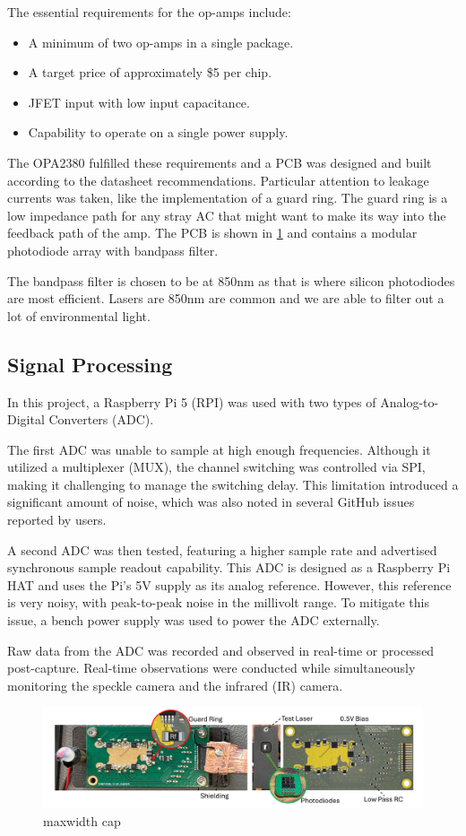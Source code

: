 The essential requirements for the op-amps include:
\begin{itemize}
  \item A minimum of two op-amps in a single package.
  \item A target price of approximately \$5 per chip.
  \item JFET input with low input capacitance.
  \item Capability to operate on a single power supply.
\end{itemize}

The OPA2380 fulfilled these requirements and a PCB was designed and built according to the datasheet recommendations. Particular attention to leakage currents was taken, like the implementation of a guard ring. The guard ring is a low impedance path for any stray AC that might want to make its way into the feedback path of the amp. The PCB is shown in \ref{fig:pcb} and contains a modular photodiode array with bandpass filter.

The bandpass filter is chosen to be at 850nm as that is where silicon photodiodes are most efficient. Lasers are 850nm are common and we are able to filter out a lot of environmental light.


\subsection{Signal Processing}

In this project, a Raspberry Pi 5 (RPI) was used with two types of Analog-to-Digital Converters (ADC).

The first ADC was unable to sample at high enough frequencies. Although it utilized a multiplexer (MUX), the channel switching was controlled via SPI, making it challenging to manage the switching delay. This limitation introduced a significant amount of noise, which was also noted in several GitHub issues reported by users.

A second ADC was then tested, featuring a higher sample rate and advertised synchronous sample readout capability. This ADC is designed as a Raspberry Pi HAT and uses the Pi's 5V supply as its analog reference. However, this reference is very noisy, with peak-to-peak noise in the millivolt range. To mitigate this issue, a bench power supply was used to power the ADC externally.

Raw data from the ADC was recorded and observed in real-time or processed post-capture. Real-time observations were conducted while simultaneously monitoring the speckle camera and the infrared (IR) camera.




\begin{figure}[t]
  \centering
  \includegraphics[width=\textwidth]{figures/impl/pcb_design.pdf}
  \caption{maxwidth cap}
  \label{fig:pcb}
\end{figure}
